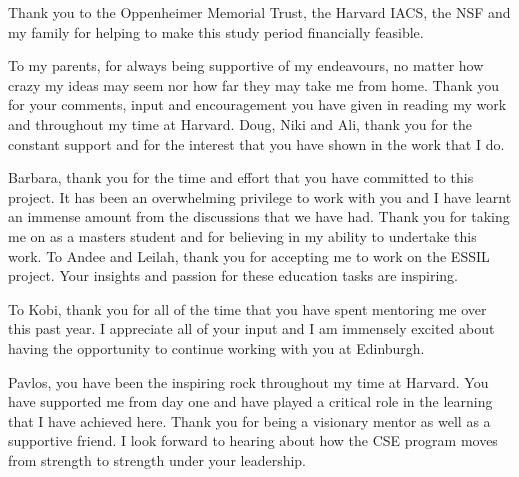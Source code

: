 \documentclass[11pt]{gsasthesis} %
\begin{document}
\renewcommand{\contentsname}{\protect\centering\protect\Large Contents}
\renewcommand{\listtablename}{\protect\centering\protect\Large List of Tables}
\renewcommand{\listfigurename}{\protect\centering\protect\Large List of Figures}

\newcommand{\indep}{\mathrel{\text{\scalebox{1.07}{$\perp\mkern-10mu\perp$}}}}

\tableofcontents %

\listoffigures
\begin{acknowledgments}
	Thank you to the Oppenheimer Memorial Trust, the Harvard IACS, the NSF and my family for helping to make this study period financially feasible.

  To my parents, for always being supportive of my endeavours, no matter how crazy my ideas may seem nor how far they may take me from home. Thank you for your comments, input and encouragement you have given in reading my work and throughout my time at Harvard. Doug, Niki and Ali, thank you for the constant support and for the interest that you have shown in the work that I do.
  
  Barbara, thank you for the time and effort that you have committed to this project. It has been an overwhelming privilege to work with you and I have learnt an immense amount from the discussions that we have had. Thank you for taking me on as a masters student and for believing in my ability to undertake this work. To Andee and Leilah, thank you for accepting me to work on the ESSIL project. Your insights and passion for these education tasks are inspiring.
   
  To Kobi, thank you for all of the time that you have spent mentoring me over this past year. I appreciate all of your input and I am immensely excited about having the opportunity to continue working with you at Edinburgh.
   
   Pavlos, you have been the inspiring rock throughout my time at Harvard. You have supported me from day one and have played a critical role in the learning that I have achieved here. Thank you for being a visionary mentor as well as a supportive friend. I look forward to hearing about how the CSE program moves from strength to strength under your leadership.
\end{acknowledgments}
\end{document}
